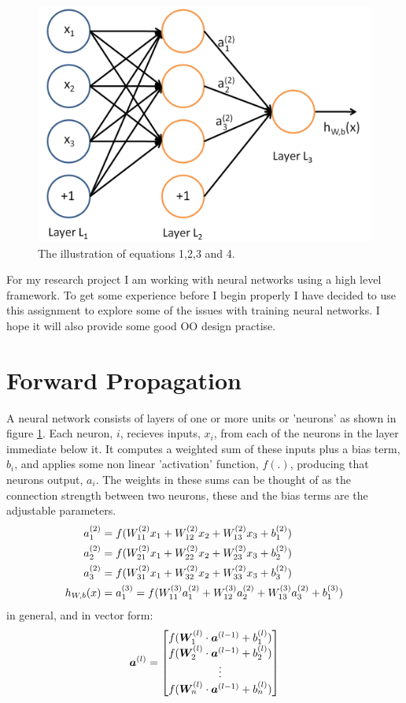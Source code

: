 \documentclass[11pt]{article} %
\begin{document}
\begin{figure}
\centering
\includegraphics*[width=0.4\linewidth,clip]{NNfig1}
\caption{The illustration of equations 1,2,3 and 4. 
\label{NNfig1}  } 
\end{figure}

For my research project I am working with neural networks using a high level framework. To get some experience before I begin properly I have decided to use this assignment to explore some of the issues with training neural networks. I hope it will also provide some good OO design practise.


\section{Forward Propagation}

A neural network consists of layers of one or more units or 'neurons' as shown in figure \ref{NNfig1}. Each neuron, $i$,  recieves inputs, $x_i$, from each of the neurons in the layer immediate below it. It computes a weighted sum of these inputs plus a bias term, $b_i$, and applies some non linear 'activation' function, $f(.)$, producing that neurons output, $a_i$. The weights in these sums can be thought of as the connection strength between two neurons, these and the bias terms are the adjustable parameters.
\begin{align}
\centering
a_1^{(2)} &= f(W_{11}^{(2)}x_1 + W_{12}^{(2)} x_2 + W_{13}^{(2)} x_3 + b_1^{(2)})  \\
a_2^{(2)} &= f(W_{21}^{(2)}x_1 + W_{22}^{(2)} x_2 + W_{23}^{(2)} x_3 + b_2^{(2)})  \\
a_3^{(2)} &= f(W_{31}^{(2)}x_1 + W_{32}^{(2)} x_2 + W_{33}^{(2)} x_3 + b_3^{(2)})  \\
h_{W,b}(x) &= a_1^{(3)} =  f(W_{11}^{(3)}a_1^{(2)} + W_{12}^{(3)} a_2^{(2)} + W_{13}^{(3)} a_3^{(2)} + b_1^{(3)}) 
\end{align}
in general, and in vector form:
\begin{align}
\centering
\boldsymbol a^{(l)} = 
\begin{bmatrix}
f(\boldsymbol W^{(l)}_1\cdot \boldsymbol a^{(l-1)} +b^{(l)}_1)\\ 
f(\boldsymbol W^{(l)}_2\cdot \boldsymbol a^{(l-1)} +b^{(l)}_2)\\ 
\vdots\\ 
f(\boldsymbol W^{(l)}_n\cdot \boldsymbol a^{(l-1)} +b^{(l)}_n)\\
\end{bmatrix}
\end{align}
\end{document}
